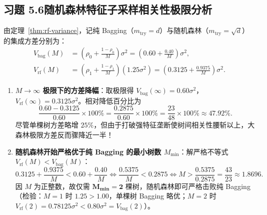 \subsection*{习题 5.6\quad 随机森林特征子采样相关性极限分析}
由定理~\ref{thm:rf-variance}，记纯 Bagging（$m_{\mathrm{try}} = d$）与随机森林（$m_{\mathrm{try}} = \sqrt{d}$）的集成方差分别为：
\begin{align*}
  V_{\mathrm{bag}}(M) &= \left(\rho_0 + \frac{1 - \rho_0}{M}\right)\sigma^2 = \left(0.60 + \frac{0.40}{M}\right)\sigma^2, \\
  V_{\mathrm{rf}}(M)  &= \left(\rho_1 + \frac{1 - \rho_1}{M}\right)(1.25\sigma^2) = \left(0.3125 + \frac{0.9375}{M}\right)\sigma^2.
\end{align*}
\begin{enumerate}[label=(\arabic*), leftmargin=1.8em]
  \item \textbf{$M \to \infty$ 极限下的方差降幅}：取极限得 $V_{\mathrm{bag}}(\infty) = 0.60\sigma^2$，$V_{\mathrm{rf}}(\infty) = 0.3125\sigma^2$。相对降低百分比为
  \[
    \frac{0.60 - 0.3125}{0.60} \times 100\% = \frac{0.2875}{0.60} \times 100\% = \frac{23}{48} \times 100\% \approx \mathbf{47.92\%}.
  \]
  尽管单棵树方差略增 $25\%$，但由于打破强特征垄断使树间相关性腰斩以上，大森林极限方差反而骤降近一半！
  \item \textbf{随机森林开始严格优于纯 Bagging 的最小树数 $M_{\min}$}：解严格不等式 $V_{\mathrm{rf}}(M) < V_{\mathrm{bag}}(M)$：
  \[
    0.3125 + \frac{0.9375}{M} < 0.60 + \frac{0.40}{M}
    \iff \frac{0.5375}{M} < 0.2875
    \iff M > \frac{0.5375}{0.2875} = \frac{43}{23} \approx 1.8696.
  \]
  因 $M$ 为正整数，故仅需 $\mathbf{M_{\min} = 2}$ 棵树，随机森林即可严格击败纯 Bagging（检验：$M=1$ 时 $1.25 > 1.00$，单棵树 Bagging 略优；$M=2$ 时 $V_{\mathrm{rf}}(2) = 0.78125\sigma^2 < 0.80\sigma^2 = V_{\mathrm{bag}}(2)$）。
\end{enumerate}

